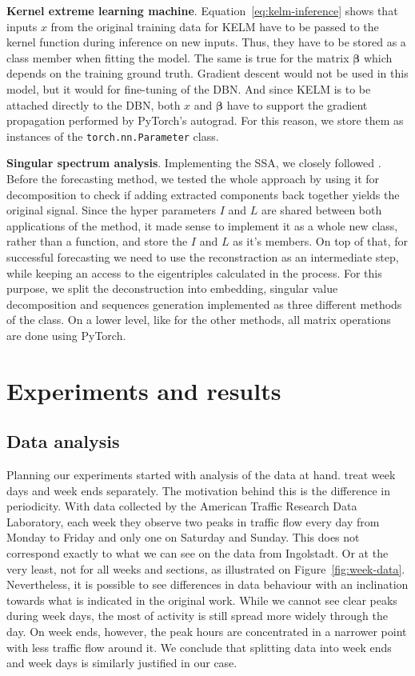 \textbf{Kernel extreme learning machine}. Equation~\ref{eq:kelm-inference} shows
that inputs $x$ from the original training data for KELM have to be passed to
the kernel function during inference on new inputs. Thus, they have to be stored
as a class member when fitting the model. The same is true for the matrix
$\mathbf{\beta}$ which depends on the training ground truth. Gradient descent
would not be used in this model, but it would for fine-tuning of the DBN. And
since KELM is to be attached directly to the DBN, both $x$ and $\mathbf{\beta}$
have to support the gradient propagation performed by PyTorch's autograd. For
this reason, we store them as instances of the \texttt{torch.nn.Parameter}
class.

\textbf{Singular spectrum analysis}. Implementing the SSA, we closely followed
\citet{Golyandina.2014}. Before the forecasting method, we tested the whole
approach by using it for decomposition to check if adding extracted components
back together yields the original signal. Since the hyper parameters $I$ and $L$
are shared between both applications of the method, it made sense to implement
it as a whole new class, rather than a function, and store the $I$ and $L$ as
it's members. On top of that, for successful forecasting we need to use the
reconstraction as an intermediate step, while keeping an access to the
eigentriples calculated in the process. For this purpose, we split the
deconstruction into embedding, singular value decomposition and sequences
generation implemented as three different methods of the class. On a lower
level, like for the other methods, all matrix operations are done using PyTorch.


\chapter{Experiments and results}

\section{Data analysis}

Planning our experiments started with analysis of the data at hand.
\citet{Han.2020} treat week days and week ends separately. The motivation behind
this is the difference in periodicity. With data collected by the American
Traffic Research Data Laboratory, each week they observe two peaks in traffic
flow every day from Monday to Friday and only one on Saturday and Sunday. This
does not correspond exactly to what we can see on the data from Ingolstadt. Or
at the very least, not for all weeks and sections, as illustrated on
Figure~\ref{fig:week-data}. Nevertheless, it is possible to see  differences in
data behaviour with an inclination towards what is indicated in the original
work. While we cannot see clear peaks during week days, the most of activity is
still spread more widely through the day. On week ends, however, the peak hours
are concentrated in a narrower point with less traffic flow around it. We
conclude that splitting data into week ends and week days is similarly justified
in our case.

